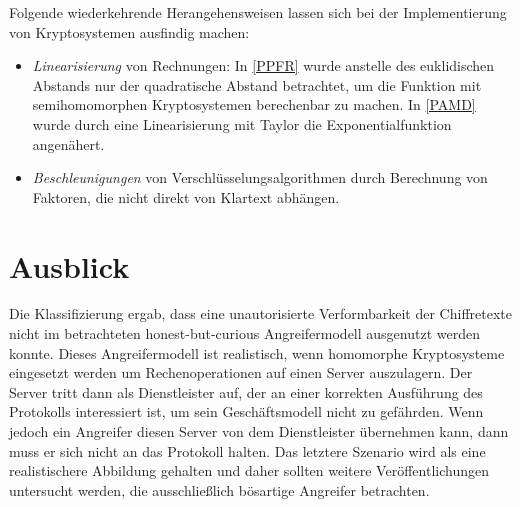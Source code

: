 Folgende wiederkehrende Herangehensweisen lassen sich bei der Implementierung von Kryptosystemen ausfindig machen:


\begin{itemize}
	\item \textit{Linearisierung} von Rechnungen: In \ref{PPFR} wurde anstelle des euklidischen Abstands nur der quadratische Abstand betrachtet, um die Funktion mit semihomomorphen Kryptosystemen berechenbar zu machen. In \ref{PAMD} wurde durch eine Linearisierung mit Taylor die Exponentialfunktion angenähert.
	\item \textit{Beschleunigungen} von Verschlüsselungsalgorithmen durch Berechnung von Faktoren, die nicht direkt von Klartext abhängen. 
\end{itemize} 

\section{Ausblick}

Die Klassifizierung ergab, dass eine unautorisierte Verformbarkeit der Chiffretexte nicht im betrachteten honest-but-curious Angreifermodell ausgenutzt werden konnte. Dieses Angreifermodell ist realistisch, wenn homomorphe Kryptosysteme eingesetzt werden um Rechenoperationen auf einen Server auszulagern. Der Server tritt dann als Dienstleister auf, der an einer korrekten Ausführung des Protokolls interessiert ist, um sein Geschäftsmodell nicht zu gefährden. Wenn jedoch ein Angreifer diesen Server von dem Dienstleister übernehmen kann, dann muss er sich nicht an das Protokoll halten.
Das letztere Szenario wird als eine realistischere Abbildung gehalten und daher sollten weitere Veröffentlichungen untersucht werden, die ausschließlich bösartige Angreifer betrachten.

